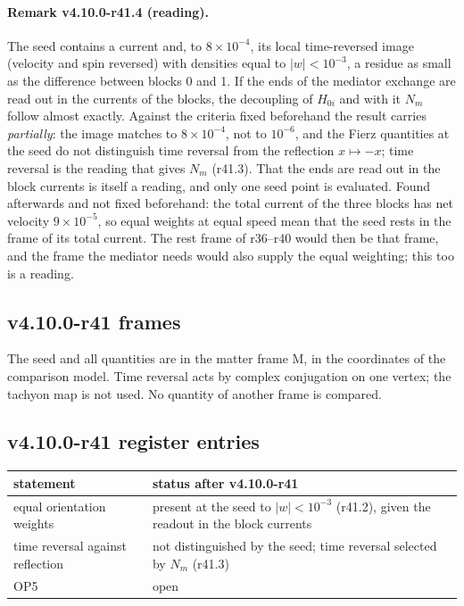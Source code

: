 \paragraph{Remark v4.10.0-r41.4 (reading).}
The seed contains a current and, to \(8\times10^{-4}\), its local time-reversed image (velocity and spin reversed) with densities equal to
\(|w|<10^{-3}\), a residue as small as the difference between blocks 0 and 1.  If the ends of the mediator exchange are read out in the currents of
the blocks, the decoupling of \(H_{0i}\) and with it \(N_m\) follow almost exactly.  Against the criteria fixed beforehand the result carries
\emph{partially}: the image matches to \(8\times10^{-4}\), not to \(10^{-6}\), and the Fierz quantities at the seed do not distinguish time reversal from
the reflection \(x\mapsto-x\); time reversal is the reading that gives \(N_m\) (r41.3).  That the ends are read out in the block currents is itself a
reading, and only one seed point is evaluated.  Found afterwards and not fixed beforehand: the total current of the three blocks has net velocity
\(9\times10^{-5}\), so equal weights at equal speed mean that the seed rests in the frame of its total current.  The rest frame of r36--r40 would then be
that frame, and the frame the mediator needs would also supply the equal weighting; this too is a reading.

\subsection*{v4.10.0-r41 frames}
\label{subsec:v4100-r41-frames}

The seed and all quantities are in the matter frame M, in the coordinates of the comparison model.  Time reversal acts by complex conjugation
on one vertex; the tachyon map is not used.  No quantity of another frame is compared.

\subsection*{v4.10.0-r41 register entries}
\label{subsec:v4100-r41-register}

\begin{center}
\small
\begin{tabular}{@{}>{\raggedright\arraybackslash}p{}>{\raggedright\arraybackslash}p{}@{}}
\toprule
statement & status after v4.10.0-r41\\
\midrule
equal orientation weights & present at the seed to \(|w|<10^{-3}\) (r41.2), given the readout in the block currents\\
time reversal against reflection & not distinguished by the seed; time reversal selected by \(N_m\) (r41.3)\\
OP5 & open\\
\bottomrule
\end{tabular}
\end{center}

